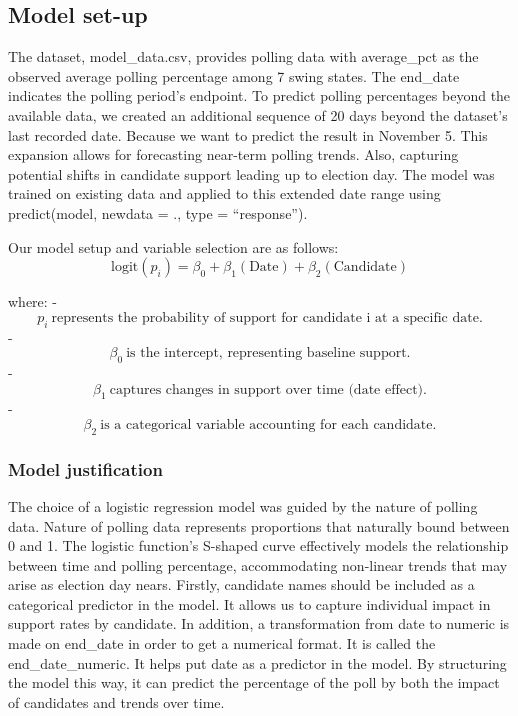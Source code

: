 \documentclass[
  letterpaper,
  DIV=11,
  numbers=noendperiod]{scrartcl}
\begin{document}
\hypertarget{model-set-up}{%
\subsection{Model set-up}\label{model-set-up}}

The dataset, model\_data.csv, provides polling data with average\_pct as
the observed average polling percentage among 7 swing states. The
end\_date indicates the polling period's endpoint. To predict polling
percentages beyond the available data, we created an additional sequence
of 20 days beyond the dataset's last recorded date. Because we want to
predict the result in November 5. This expansion allows for forecasting
near-term polling trends. Also, capturing potential shifts in candidate
support leading up to election day. The model was trained on existing
data and applied to this extended date range using predict(model,
newdata = ., type = ``response'').

Our model setup and variable selection are as follows: \[
\text{logit}(p_i) = \beta_0 + \beta_1 (\text{Date}) + \beta_2 (\text{Candidate})
\]

where: -
\[p_i \ \text{represents the probability of support for candidate i at a specific date.}\]
- \[\beta_0 \ \text{is the intercept, representing baseline support.}\]
-
\[\beta_1 \ \text{captures changes in support over time (date effect).}\]
-
\[\beta_2 \ \text{is a categorical variable accounting for each candidate.}\]

\hypertarget{model-justification}{%
\subsubsection{Model justification}\label{model-justification}}

The choice of a logistic regression model was guided by the nature of
polling data. Nature of polling data represents proportions that
naturally bound between 0 and 1. The logistic function's S-shaped curve
effectively models the relationship between time and polling percentage,
accommodating non-linear trends that may arise as election day nears.
Firstly, candidate names should be included as a categorical predictor
in the model. It allows us to capture individual impact in support rates
by candidate. In addition, a transformation from date to numeric is made
on end\_date in order to get a numerical format. It is called the
end\_date\_numeric. It helps put date as a predictor in the model. By
structuring the model this way, it can predict the percentage of the
poll by both the impact of candidates and trends over time.
\end{document}
